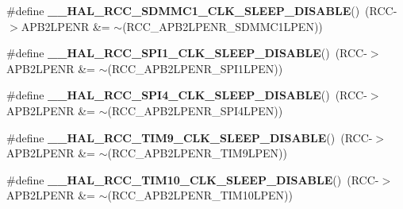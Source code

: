 \begin{DoxyCompactItemize}
\item 
\mbox{\label{group___r_c_c_ex___peripheral___clock___sleep___enable___disable_gabe72608d1927f58cffdec6c56c51f002}} 
\#define {\bfseries \+\_\+\+\_\+\+H\+A\+L\+\_\+\+R\+C\+C\+\_\+\+S\+D\+M\+M\+C1\+\_\+\+C\+L\+K\+\_\+\+S\+L\+E\+E\+P\+\_\+\+D\+I\+S\+A\+B\+LE}()~(R\+CC-\/$>$A\+P\+B2\+L\+P\+E\+NR \&= $\sim$(R\+C\+C\+\_\+\+A\+P\+B2\+L\+P\+E\+N\+R\+\_\+\+S\+D\+M\+M\+C1\+L\+P\+EN))
\item 
\mbox{\label{group___r_c_c_ex___peripheral___clock___sleep___enable___disable_ga2abe90eeb15890f45e28e8926bf70838}} 
\#define {\bfseries \+\_\+\+\_\+\+H\+A\+L\+\_\+\+R\+C\+C\+\_\+\+S\+P\+I1\+\_\+\+C\+L\+K\+\_\+\+S\+L\+E\+E\+P\+\_\+\+D\+I\+S\+A\+B\+LE}()~(R\+CC-\/$>$A\+P\+B2\+L\+P\+E\+NR \&= $\sim$(R\+C\+C\+\_\+\+A\+P\+B2\+L\+P\+E\+N\+R\+\_\+\+S\+P\+I1\+L\+P\+EN))
\item 
\mbox{\label{group___r_c_c_ex___peripheral___clock___sleep___enable___disable_ga6953cffe3f6f2c92414df6c3ff07bb95}} 
\#define {\bfseries \+\_\+\+\_\+\+H\+A\+L\+\_\+\+R\+C\+C\+\_\+\+S\+P\+I4\+\_\+\+C\+L\+K\+\_\+\+S\+L\+E\+E\+P\+\_\+\+D\+I\+S\+A\+B\+LE}()~(R\+CC-\/$>$A\+P\+B2\+L\+P\+E\+NR \&= $\sim$(R\+C\+C\+\_\+\+A\+P\+B2\+L\+P\+E\+N\+R\+\_\+\+S\+P\+I4\+L\+P\+EN))
\item 
\mbox{\label{group___r_c_c_ex___peripheral___clock___sleep___enable___disable_ga531cefe824de1fa7461b34030d30d75f}} 
\#define {\bfseries \+\_\+\+\_\+\+H\+A\+L\+\_\+\+R\+C\+C\+\_\+\+T\+I\+M9\+\_\+\+C\+L\+K\+\_\+\+S\+L\+E\+E\+P\+\_\+\+D\+I\+S\+A\+B\+LE}()~(R\+CC-\/$>$A\+P\+B2\+L\+P\+E\+NR \&= $\sim$(R\+C\+C\+\_\+\+A\+P\+B2\+L\+P\+E\+N\+R\+\_\+\+T\+I\+M9\+L\+P\+EN))
\item 
\mbox{\label{group___r_c_c_ex___peripheral___clock___sleep___enable___disable_ga884747bf8ec12a16a37c512c6979fb4d}} 
\#define {\bfseries \+\_\+\+\_\+\+H\+A\+L\+\_\+\+R\+C\+C\+\_\+\+T\+I\+M10\+\_\+\+C\+L\+K\+\_\+\+S\+L\+E\+E\+P\+\_\+\+D\+I\+S\+A\+B\+LE}()~(R\+CC-\/$>$A\+P\+B2\+L\+P\+E\+NR \&= $\sim$(R\+C\+C\+\_\+\+A\+P\+B2\+L\+P\+E\+N\+R\+\_\+\+T\+I\+M10\+L\+P\+EN))

\end{DoxyCompactItemize}
